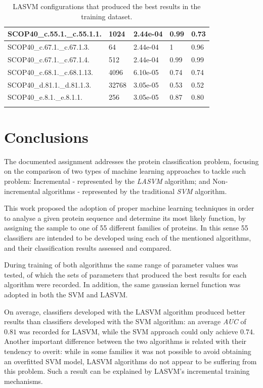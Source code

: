 \documentclass[11pt]{article}
\begin{document}
\begin{longtable}{|p{}|p{}|p{}|p{}|p{}|}
	SCOP40\_c.55.1.\_c.55.1.1.    & 1024    & 2.44e-04  & 0.99  & 0.73 \\ \hline
	
	SCOP40\_c.67.1.\_c.67.1.3.    & 64      & 2.44e-04  & 1     & 0.96 \\ \hline
	
	SCOP40\_c.67.1.\_c.67.1.4.    & 512     & 2.44e-04  & 0.99  & 0.99 \\ \hline
	
	SCOP40\_c.68.1.\_c.68.1.13.   & 4096    & 6.10e-05  & 0.74  & 0.74 \\ \hline
	
	SCOP40\_d.81.1.\_d.81.1.3.    & 32768   & 3.05e-05  & 0.53  & 0.52 \\ \hline
	
	SCOP40\_e.8.1.\_e.8.1.1.      & 256     & 3.05e-05  & 0.87  & 0.80  \\ \hline
	\caption{LASVM configurations that produced the best results in the training dataset.}
	\label{lasvm_results}
\end{longtable}

\section{Conclusions}
\label{conclusions}

The documented assignment addresses the protein classification problem, focusing on the comparison of two types of machine learning approaches to tackle such problem: Incremental - represented by the \emph{LASVM} algorithm; and Non-incremental algorithms - represented by the traditional \emph{SVM} algorithm.

This work proposed the adoption of proper machine learning techniques in order to analyse a given protein sequence and determine its most likely function, by assigning the sample to one of 55 different families of proteins. In this sense 55 classifiers are intended to be developed using each of the mentioned algorithms, and their classification results assessed and compared.

During training of both algorithms the same range of parameter values was tested, of which the sets of parameters that produced the best results for each algorithm were recorded. In addition, the same gaussian kernel function was adopted in both the SVM and LASVM.

On average, classifiers developed with the LASVM algorithm produced better results than classifiers developed with the SVM algorithm: an average \emph{AUC} of $0.81$ was recorded for LASVM, while the SVM approach could only achieve $0.74$. Another important difference between the two algorithms is related with their tendency to overit: while in some families it was not possible to avoid obtaining an overfitted SVM model, LASVM algorithms do not appear to be suffering from this problem. Such a result can be explained by LASVM's incremental training mechanisms. 
\end{document}
